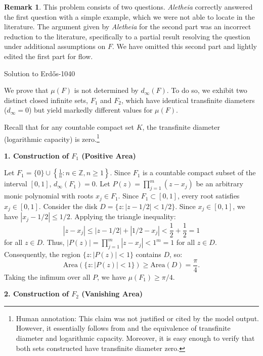 \documentclass{article}
\theoremstyle{plain}
\theoremstyle{definition}
\newtheorem{remark}{Remark}[section]
\newcommand{\Aletheia}{\emph{Aletheia}}
\begin{document}
\begin{remark} This problem consists of two questions. {\Aletheia} correctly answered the first question with a simple example, which we were not able to locate in the literature. The argument given by {\Aletheia} for the second part was an incorrect reduction to the literature, specifically to a partial result \cite{krishnapur2025areapolynomiallemniscates} resolving the question under additional assumptions on $F$. We have omitted this second part and lightly edited the first part for flow.
\end{remark}

\begin{solution}{Solution to Erdős-1040}

We prove that $\mu(F)$ is not determined by $d_\infty(F)$. To do so, we exhibit two distinct closed infinite sets, $F_1$ and $F_2$, which have identical transfinite diameters ($d_\infty = 0$) but yield markedly different values for $\mu(F)$.

Recall that for any countable compact set $K$, the transfinite diameter (logarithmic capacity) is zero.\footnote{Human annotation: This claim was not justified or cited by the model output. However, it essentially follows from \cite[Corollary 3.2.5]{Ran95} and the equivalence of transfinite diameter and logarithmic capacity. Moreover, it is easy enough to verify that both sets constructed have transfinite diameter zero.}

\medskip
\textbf{1. Construction of $F_1$ (Positive Area)}

Let $F_1 = \{0\} \cup \left\{ \frac{1}{n} : n \in \mathbb{Z}, n \ge 1 \right\}$.
Since $F_1$ is a countable compact subset of the interval $[0, 1]$, $d_\infty(F_1) = 0$.
Let $P(z) = \prod_{j=1}^m (z - x_j)$ be an arbitrary monic polynomial with roots $x_j \in F_1$.
Since $F_1 \subset [0, 1]$, every root satisfies $x_j \in [0, 1]$.
Consider the disk $D = \{ z : |z - 1/2| < 1/2 \}$.
Since $x_j \in [0, 1]$, we have $|x_j - 1/2| \le 1/2$.
Applying the triangle inequality:
\[ |z - x_j| \le |z - 1/2| + |1/2 - x_j| < \frac{1}{2} + \frac{1}{2} = 1\]
for all $z\in D$. Thus, $|P(z)| = \prod_{j=1}^{m} |z - x_j| < 1^m = 1$ for all $z \in D$.
Consequently, the region $\{ z: \lvert P(z)\rvert < 1\}$ contains $D$, so:
\[ \text{Area}(\{z : |P(z)| < 1\}) \ge \text{Area}(D) = \frac{\pi}{4}. \]
Taking the infimum over all $P$, we have $\mu(F_1) \ge \pi/4$.

\medskip
\textbf{2. Construction of $F_2$ (Vanishing Area)}


\end{solution}
\end{document}
